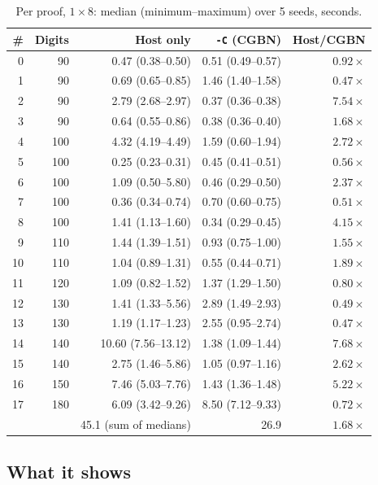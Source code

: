 \documentclass[11pt,a4paper]{article}
\newcommand{\code}[1]{\texttt{#1}}
\begin{document}
\begin{table}[ht]
\centering
\small
\begin{tabular}{rrrrr}
\toprule
\# & Digits & Host only & \code{-C} (CGBN) & Host/CGBN \\
\midrule
0  & 90  & 0.47 (0.38--0.50)   & 0.51 (0.49--0.57) & $0.92\times$ \\
1  & 90  & 0.69 (0.65--0.85)   & 1.46 (1.40--1.58) & $0.47\times$ \\
2  & 90  & 2.79 (2.68--2.97)   & 0.37 (0.36--0.38) & $7.54\times$ \\
3  & 90  & 0.64 (0.55--0.86)   & 0.38 (0.36--0.40) & $1.68\times$ \\
4  & 100 & 4.32 (4.19--4.49)   & 1.59 (0.60--1.94) & $2.72\times$ \\
5  & 100 & 0.25 (0.23--0.31)   & 0.45 (0.41--0.51) & $0.56\times$ \\
6  & 100 & 1.09 (0.50--5.80)   & 0.46 (0.29--0.50) & $2.37\times$ \\
7  & 100 & 0.36 (0.34--0.74)   & 0.70 (0.60--0.75) & $0.51\times$ \\
8  & 100 & 1.41 (1.13--1.60)   & 0.34 (0.29--0.45) & $4.15\times$ \\
9  & 110 & 1.44 (1.39--1.51)   & 0.93 (0.75--1.00) & $1.55\times$ \\
10 & 110 & 1.04 (0.89--1.31)   & 0.55 (0.44--0.71) & $1.89\times$ \\
11 & 120 & 1.09 (0.82--1.52)   & 1.37 (1.29--1.50) & $0.80\times$ \\
12 & 130 & 1.41 (1.33--5.56)   & 2.89 (1.49--2.93) & $0.49\times$ \\
13 & 130 & 1.19 (1.17--1.23)   & 2.55 (0.95--2.74) & $0.47\times$ \\
14 & 140 & 10.60 (7.56--13.12) & 1.38 (1.09--1.44) & $7.68\times$ \\
15 & 140 & 2.75 (1.46--5.86)   & 1.05 (0.97--1.16) & $2.62\times$ \\
16 & 150 & 7.46 (5.03--7.76)   & 1.43 (1.36--1.48) & $5.22\times$ \\
17 & 180 & 6.09 (3.42--9.26)   & 8.50 (7.12--9.33) & $0.72\times$ \\
\midrule
   &     & 45.1 (sum of medians) & 26.9           & $1.68\times$ \\
\bottomrule
\end{tabular}
\caption{Per proof, $1 \times 8$: median (minimum--maximum) over 5 seeds,
  seconds.}
\label{tab:per}
\end{table}

\subsection{What it shows}
\end{document}
